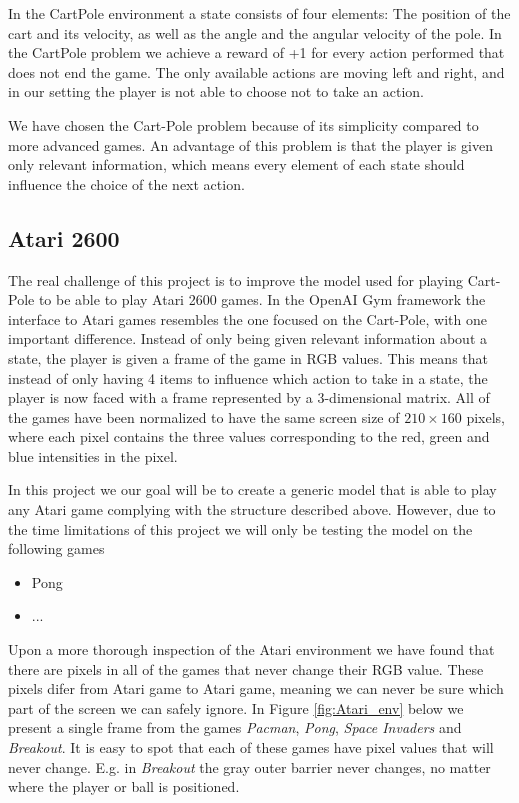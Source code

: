 \documentclass[11pt]{article}
\begin{document}
In the CartPole environment a state consists of four elements: The position of the cart and its velocity, as well as the angle and the angular velocity of the pole.
In the CartPole problem we achieve a reward of +1 for every action performed that does not end the game.
The only available actions are moving left and right, and in our setting the player is not able to choose not to take
an action.

We have chosen the Cart-Pole problem because of its simplicity compared to more advanced games.
An advantage of this problem is that the player is given only relevant information, which means every element
of each state should influence the choice of the next action.

\subsection{Atari 2600}

The real challenge of this project is to improve the model used for playing Cart-Pole to be able to
play Atari 2600 games.
In the OpenAI Gym framework the interface to Atari games resembles the one focused on the Cart-Pole,
with one important difference.
Instead of only being given relevant information about a state, the player is given a frame of the
game in RGB values.
This means that instead of only having 4 items to influence which action to take in a state,
the player is now faced with a frame represented by a 3-dimensional matrix.
All of the games have been normalized to have the same screen size of $210 \times 160$ pixels,
where each pixel contains the three values corresponding to the red, green and blue intensities in the pixel.

In this project we our goal will be to create a generic model that is able to play
any Atari game complying with the structure described above.
However, due to the time limitations of this project we will only
be testing the model on the following games
\begin{itemize}
    \item Pong
    \item ...
\end{itemize}

Upon a more thorough inspection of the Atari environment we have found that
there are pixels in all of the games that never change their RGB value.
These pixels difer from Atari game to Atari game, meaning we can never be sure which part
of the screen we can safely ignore.
In Figure \ref{fig:Atari_env} below we present a single frame from the games
\textit{Pacman}, \textit{Pong}, \textit{Space Invaders} and \textit{Breakout}.
It is easy to spot that each of these games have pixel values that will never change.
E.g. in \textit{Breakout} the gray outer barrier never changes, no matter where the player or ball
is positioned.
\end{document}
